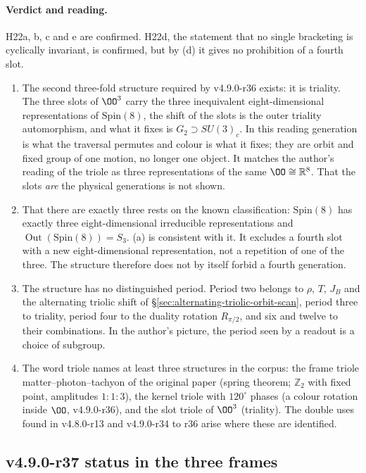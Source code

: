 \paragraph{Verdict and reading.}
H22a, b, c and e are confirmed.  H22d, the statement that no single bracketing is cyclically invariant, is confirmed, but by (d)
it gives no prohibition of a fourth slot.
\begin{enumerate}[leftmargin=2em]
\item The second three-fold structure required by v4.9.0-r36 exists: it is triality.  The three slots of \(\OO^3\) carry the three
inequivalent eight-dimensional representations of \(\mathrm{Spin}(8)\), the shift of the slots is the outer triality automorphism,
and what it fixes is \(G_2\supset SU(3)_c\).  In this reading generation is what the traversal permutes and colour is what it
fixes; they are orbit and fixed group of one motion, no longer one object.  It matches the author's reading of the triole as
three representations of the same \(\OO\cong\mathbb R^8\).  That the slots \emph{are} the physical generations is not shown.
\item That there are exactly three rests on the known classification: \(\mathrm{Spin}(8)\) has exactly three eight-dimensional
irreducible representations and \(\operatorname{Out}(\mathrm{Spin}(8))=S_3\).  (a) is consistent with it.  It excludes a fourth slot
with a new eight-dimensional representation, not a repetition of one of the three.  The structure therefore does not by itself
forbid a fourth generation.
\item The structure has no distinguished period.  Period two belongs to \(\rho\), \(T\), \(J_B\) and the alternating triolic shift of
\S\ref{sec:alternating-triolic-orbit-scan}, period three to triality, period four to the duality rotation \(R_{\pi/2}\), and six and
twelve to their combinations.  In the author's picture, the period seen by a readout is a choice of subgroup.
\item The word triole names at least three structures in the corpus: the frame triole matter--photon--tachyon of the original
paper (spring theorem; \(\mathbb Z_2\) with fixed point, amplitudes \(1:1:3\)), the kernel triole with \(120^\circ\) phases (a colour
rotation inside \(\OO\), v4.9.0-r36), and the slot triole of \(\OO^3\) (triality).  The double uses found in v4.8.0-r13 and
v4.9.0-r34 to r36 arise where these are identified.
\end{enumerate}

\subsection*{v4.9.0-r37 status in the three frames}
\label{subsec:v490-r37-frames}

